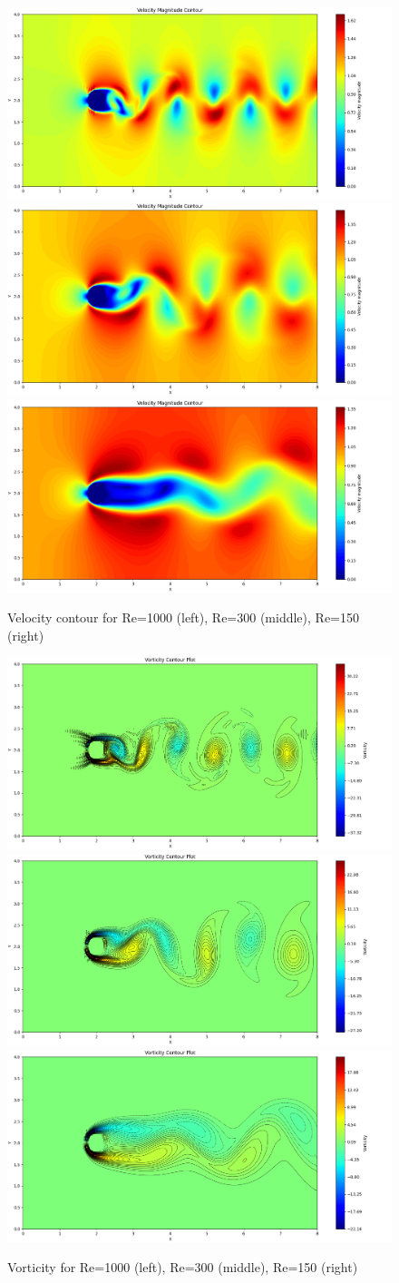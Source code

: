\documentclass[12pt]{article}
\begin{document}
\begin{figure}[H]
    \centering
    \includegraphics[width=0.3\linewidth]{figure/N32_Re1000_8x4_t50/v_N32_Re1000_8x4_t50.jpg}
    \includegraphics[width=0.3\linewidth]{figure/N32_Re300_8x4_t50/v_N32_Re300_8x4_t50.jpg}
    \includegraphics[width=0.3\linewidth]{figure/N32_Re150_8x4_t50/v_N32_Re150_8x4_t50.jpg}
    \caption{Velocity contour for Re=1000 (left), Re=300 (middle), Re=150 (right) }
\end{figure}



\begin{figure}[H]
    \centering
    \includegraphics[width=0.3\linewidth]{figure/N32_Re1000_8x4_t50/vor_N32_Re1000_8x4_t50.jpg}
    \includegraphics[width=0.3\linewidth]{figure/N32_Re300_8x4_t50/vor_N32_Re300_8x4_t50.jpg}
    \includegraphics[width=0.3\linewidth]{figure/N32_Re150_8x4_t50/vor_N32_Re150_8x4_t50.jpg}
    \caption{Vorticity for Re=1000 (left), Re=300 (middle), Re=150 (right) }
\end{figure}
\end{document}
